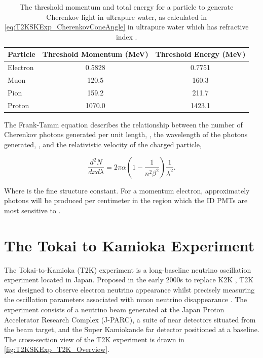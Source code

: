\begin{table}[ht!]
    \centering
    \begin{tabular}{l|c|c}
      \hline
      Particle & Threshold Momentum (MeV) & Threshold Energy (MeV)\\
      \hline
      Electron & 0.5828 & 0.7751 \\
      Muon & 120.5 & 160.3 \\
      Pion & 159.2 & 211.7 \\
      Proton & 1070.0 & 1423.1 \\
      \hline
      \hline
    \end{tabular}
    \caption{The threshold momentum and total energy for a particle to generate Cherenkov light in ultrapure water, as calculated in \autoref{eq:T2KSKExp_CherenkovConeAngle} in ultrapure water which has refractive index .}
    \label{tab:T2KSKExp_CherenkovThreshold}
\end{table}

The Frank-Tamm equation \cite{Frank1991-wj} describes the relationship between the number of Cherenkov photons generated per unit length, , the wavelength of the photons generated, \quickmath{\lambda}, and the relativistic velocity of the charged particle,

\begin{equation}
  \label{eq:T2KSKExp_FrankTammFormula}
  \frac{d^2N}{dxd\lambda} = 2\pi\alpha \left(1 - \frac{1}{n^2 \beta^2} \right)\frac{1}{\lambda^2} .
\end{equation}

Where \quickmath{\alpha} is the fine structure constant. For a  momentum electron, approximately  photons will be produced per centimeter in the  region which the ID PMTs are most sensitive to \cite{Fukuda2003-ly}.

\section{The Tokai to Kamioka Experiment}
\label{sec:T2KSKExp_T2K}

The Tokai-to-Kamioka (T2K) experiment is a long-baseline neutrino oscillation experiment located in Japan. Proposed in the early 2000s \cite{jhf_loi, Itow2001-bc} to replace K2K \cite{The_K2K_Collaboration2001-oo}, T2K was designed to observe electron neutrino appearance whilst precisely measuring the oscillation parameters associated with muon neutrino disappearance \cite{t2k_proposal}. The experiment consists of a neutrino beam generated at the Japan Proton Accelerator Research Complex (J-PARC), a suite of near detectors situated  from the beam target, and the Super Kamiokande far detector positioned at a  baseline. The cross-section view of the T2K experiment is drawn in \autoref{fig:T2KSKExp_T2K_Overview}.

